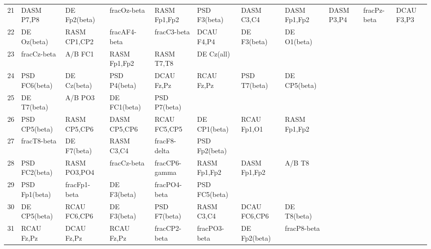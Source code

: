 \begin{landscape}
\begin{table}[]
\begin{tabular}{l|llllllll}
21       & DASM P7,P8     & DE Fp2(beta)   & fracOz-beta    & RASM Fp1,Fp2   & PSD F3(beta)   & DASM C3,C4     & DASM Fp1,Fp2  & DASM P3,P4     & fracPz-beta   & DCAU F3,P3    \\
22       & DE Oz(beta)    & RASM CP1,CP2   & fracAF4-beta   & fracC3-beta    & DCAU F4,P4     & DE F3(beta)    & DE O1(beta)   &                &               &               \\
23       & fracCz-beta    & A/B FC1        & RASM Fp1,Fp2   & RASM T7,T8     & DE Cz(all)     &                &               &                &               &               \\
24       & PSD FC6(beta)  & DE Cz(beta)    & PSD P4(beta)   & DCAU Fz,Pz     & RCAU Fz,Pz     & PSD T7(beta)   & DE CP5(beta)  &                &               &               \\
25       & DE T7(beta)    & A/B PO3        & DE FC1(beta)   & PSD P7(beta)   &                &                &               &                &               &               \\
26       & PSD CP5(beta)  & RASM CP5,CP6   & DASM CP5,CP6   & RCAU FC5,CP5   & DE CP1(beta)   & RCAU Fp1,O1    & RASM Fp1,Fp2  &                &               &               \\
27       & fracT8-beta    & DE F7(beta)    & RASM C3,C4     & fracF8-delta   & PSD Fp2(beta)  &                &               &                &               &               \\
28       & PSD FC2(beta)  & RASM PO3,PO4   & fracCz-beta    & fracCP6-gamma  & RASM Fp1,Fp2   & DASM Fp1,Fp2   & A/B T8        &                &               &               \\
29       & PSD Fp1(beta)  & fracFp1-beta   & DE F3(beta)    & fracPO4-beta   & PSD FC5(beta)  &                &               &                &               &               \\
30       & DE CP5(beta)   & RCAU FC6,CP6   & DE F3(beta)    & PSD F7(beta)   & RASM C3,C4     & DCAU FC6,CP6   & DE T8(beta)   &                &               &               \\
31       & RCAU Fz,Pz     & DCAU Fz,Pz     & RCAU Fz,Pz     & fracCP2-beta   & fracPO3-beta   & DE Fp2(beta)   & fracP8-beta   &                &               &               
\end{tabular}
\end{table}
\end{landscape}